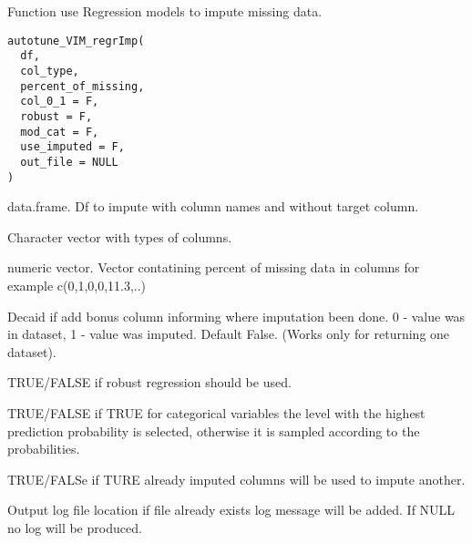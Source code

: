 \documentclass[letterpaper]{book}
\begin{document}
%
\begin{Description}\relax
Function use Regression models to impute missing data.
\end{Description}
%
\begin{Usage}
\begin{verbatim}
autotune_VIM_regrImp(
  df,
  col_type,
  percent_of_missing,
  col_0_1 = F,
  robust = F,
  mod_cat = F,
  use_imputed = F,
  out_file = NULL
)
\end{verbatim}
\end{Usage}
%
\begin{Arguments}
\begin{ldescription}
\item[\code{df}] data.frame. Df to impute with column names and without target column.

\item[\code{col\_type}] Character vector with types of columns.

\item[\code{percent\_of\_missing}] numeric vector. Vector contatining percent of missing data in columns for example  c(0,1,0,0,11.3,..)

\item[\code{col\_0\_1}] Decaid if add bonus column informing where imputation been done. 0 - value was in dataset, 1 - value was imputed. Default False. (Works only for returning one dataset).

\item[\code{robust}] TRUE/FALSE if robust regression should be used.

\item[\code{mod\_cat}] TRUE/FALSE if TRUE for categorical variables the level with the highest prediction probability is selected, otherwise it is sampled according to the probabilities.

\item[\code{use\_imputed}] TRUE/FALSe if TURE already imputed columns will be used to impute another.

\item[\code{out\_file}] Output log file location if file already exists log message will be added. If NULL no log will be produced.
\end{ldescription}
\end{Arguments}
%
\end{document}
